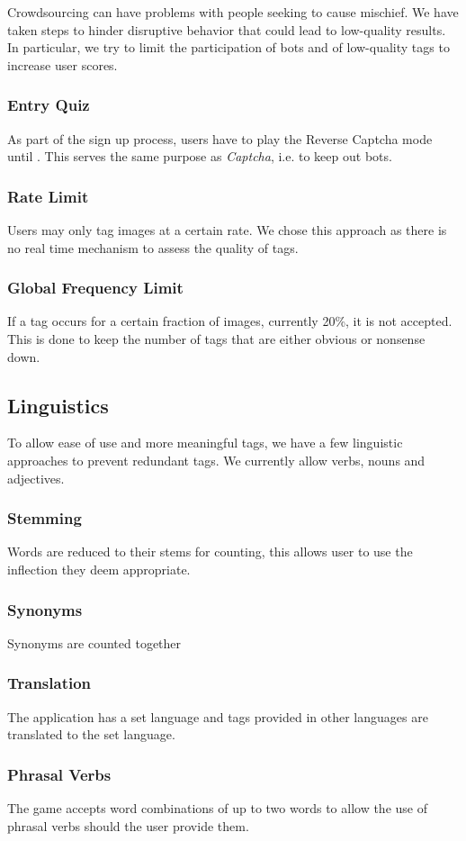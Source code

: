 Crowdsourcing can have problems with people seeking to cause mischief. We have taken steps to hinder disruptive behavior that could lead to low-quality results. In particular, we try to limit the participation of bots and  of low-quality tags to increase user scores.


\subsubsection{Entry Quiz}

As part of the sign up process, users have to play the Reverse Captcha mode until . This serves the same purpose as \textit{Captcha}, i.e. to keep out bots.


\subsubsection{Rate Limit}
Users may only tag images at a certain rate. We chose this approach as there is no real time mechanism to assess the quality of tags.

\subsubsection{Global Frequency Limit}
If a tag occurs for a certain fraction of images, currently 20\%, it is not accepted. This is done to keep the number of tags that are either obvious or nonsense down.




\subsection{Linguistics}

To allow ease of use and more meaningful tags, we have a few linguistic approaches to prevent redundant tags. We currently allow verbs, nouns and adjectives.



\subsubsection{Stemming}
Words are reduced to their stems for counting, this allows user to use the inflection they deem appropriate.


\subsubsection{Synonyms}
Synonyms are counted together


\subsubsection{Translation}
The application has a set language and tags provided in other languages are translated to the set language.


\subsubsection{Phrasal Verbs}
The game accepts word combinations of up to two words to allow the use of phrasal verbs should the user provide them.


